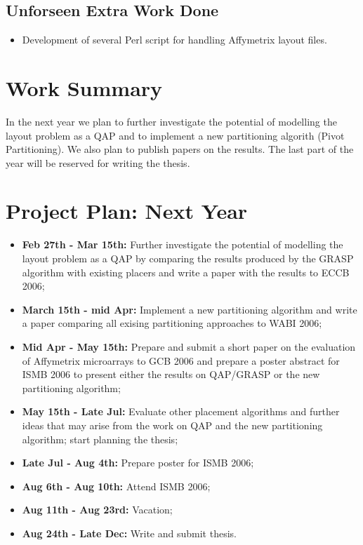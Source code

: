 \documentclass{article}
\begin{document}
\subsection*{Unforseen Extra Work Done}

\begin{itemize}
\item Development of several Perl script for handling Affymetrix layout files.
\end{itemize}

\section*{Work Summary}

In the next year we plan to further investigate the potential of modelling the layout problem as a QAP and to implement a new partitioning algorith (Pivot Partitioning). We also plan to publish papers on the results. The last part of the year will be reserved for writing the thesis.

\section*{Project Plan: Next Year}

\begin{itemize}
\item {\bf Feb 27th - Mar 15th:} Further investigate the potential of modelling the layout problem as a QAP by comparing the results produced by the GRASP algorithm with existing placers and write a paper with the results to ECCB 2006;
\item {\bf March 15th - mid Apr:} Implement a new partitioning algorithm and write a paper comparing all exising partitioning approaches to WABI 2006;
\item {\bf Mid Apr - May 15th:} Prepare and submit a short paper on the evaluation of Affymetrix microarrays to GCB 2006 and prepare a poster abstract for ISMB 2006 to present either the results on QAP/GRASP or the new partitioning algorithm;
\item {\bf May 15th - Late Jul:} Evaluate other placement algorithms and further ideas that may arise from the work on QAP and the new partitioning algorithm; start planning the thesis;
\item {\bf Late Jul - Aug 4th:} Prepare poster for ISMB 2006;
\item {\bf Aug 6th - Aug 10th:} Attend ISMB 2006;
\item {\bf Aug 11th - Aug 23rd:} Vacation;
\item {\bf Aug 24th - Late Dec:} Write and submit thesis.
\end{itemize}
\end{document}
